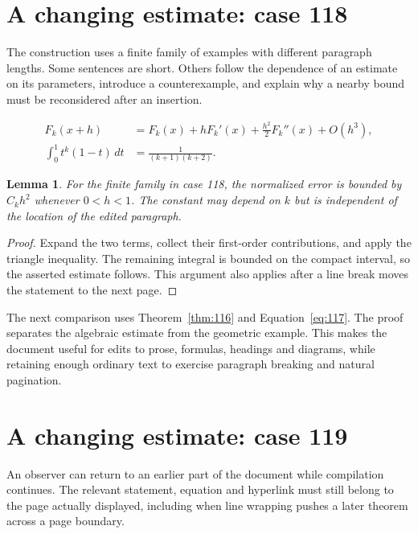 \documentclass[a4paper,10pt]{article}
\newtheorem{lemma}[theorem]{Lemma}
\begin{document}
\lipsum[8]

\section{A changing estimate: case 118}\label{unit:117}
The construction uses a finite family of examples with different paragraph lengths. Some sentences are short. Others follow the dependence of an estimate on its parameters, introduce a counterexample, and explain why a nearby bound must be reconsidered after an insertion.

\lipsum[22-23]
\begin{align}\label{eq:117}
 F_k(x+h)&=F_k(x)+hF_k'(x)+\frac{h^2}{2}F_k''(x)+O(h^3),\\
 \int_0^1 t^k(1-t)\,dt&=\frac{1}{(k+1)(k+2)}.
\end{align}
\begin{lemma}\label{thm:117}
For the finite family in case 118, the normalized error is bounded by $C_k h^2$ whenever $0<h<1$. The constant may depend on $k$ but is independent of the location of the edited paragraph.
\end{lemma}
\begin{proof}
Expand the two terms, collect their first-order contributions, and apply the
triangle inequality. The remaining integral is bounded on the compact interval,
so the asserted estimate follows. This argument also applies after a line break
moves the statement to the next page.
\end{proof}
\begin{center}
\end{center}
The next comparison uses Theorem~\ref{thm:116} and Equation~\ref{eq:117}. The proof separates the algebraic estimate from the geometric example. This makes the document useful for edits to prose, formulas, headings and diagrams, while retaining enough ordinary text to exercise paragraph breaking and natural pagination.

\lipsum[13]

\section{A changing estimate: case 119}\label{unit:118}
An observer can return to an earlier part of the document while compilation continues. The relevant statement, equation and hyperlink must still belong to the page actually displayed, including when line wrapping pushes a later theorem across a page boundary.
\end{document}

